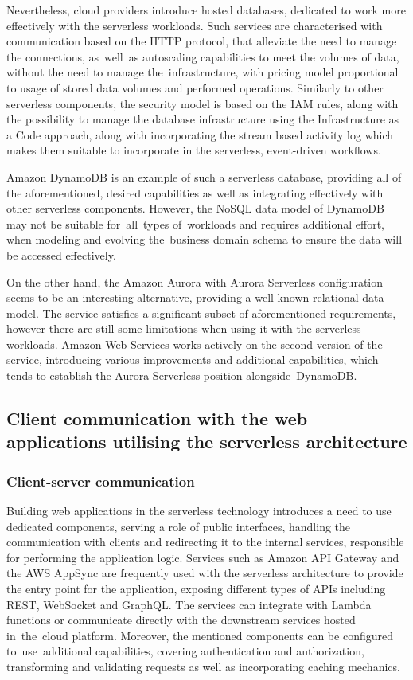 Nevertheless, cloud providers introduce hosted databases, dedicated to work more effectively with the serverless workloads.
Such services are characterised with communication based on the HTTP protocol, that alleviate the need to manage the connections, as~well~as autoscaling capabilities to meet the volumes of data, without the need to manage the~infrastructure, with pricing model proportional to usage of stored data volumes and performed operations.
Similarly to other serverless components, the security model is based on the IAM rules, along with the possibility to manage the database infrastructure using the Infrastructure as a Code approach, along with incorporating the stream based activity log which makes them suitable to incorporate in the serverless, event-driven workflows.

Amazon DynamoDB is an example of such a serverless database, providing all of the aforementioned, desired capabilities as well as integrating effectively with other serverless components.
However, the NoSQL data model of DynamoDB may not be suitable for~all~types of~workloads and requires additional effort, when modeling and evolving the~business domain schema to ensure the data will be accessed effectively.

On the other hand, the Amazon Aurora with Aurora Serverless configuration seems to be an interesting alternative, providing a well-known relational data model.
The service satisfies a significant subset of aforementioned requirements, however there are still some limitations when using it with the serverless workloads.
Amazon Web Services works actively on the second version of the service, introducing various improvements and additional capabilities, which tends to establish the Aurora Serverless position alongside~DynamoDB.

\subsection{Client communication with the web applications utilising the serverless architecture}

\subsubsection{Client-server communication}

Building web applications in the serverless technology introduces a need to use dedicated components, serving a role of public interfaces, handling the communication with clients and redirecting it to the internal services, responsible for performing the application logic.
Services such as Amazon API Gateway and the AWS AppSync are frequently used with the serverless architecture to provide the entry point for the application, exposing different types of APIs including REST, WebSocket and GraphQL.
The services can integrate with Lambda functions or communicate directly with the downstream services hosted in~the~cloud platform. 
Moreover, the mentioned components can be configured to~use~additional capabilities, covering authentication and authorization, transforming and validating requests as well as incorporating caching mechanics.

